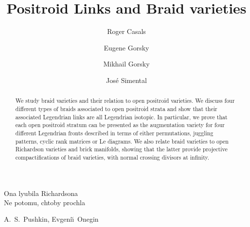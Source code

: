 \documentclass[10pt]{amsart}
\title{Positroid Links and Braid varieties}
\author[R. Casals]{Roger Casals}
\author[E. Gorsky]{Eugene Gorsky}
\author[M. Gorsky]{Mikhail Gorsky}
\author[J. Simental]{Jos\'e Simental}
\theoremstyle{plain}
\theoremstyle{definition}
\theoremstyle{remark}
\numberwithin{equation}{section}
\def\cyi{\tencyrit\cyracc}
\def\cyr{\tencyr\cyracc}
\begin{document}
\begin{abstract}
We study braid varieties and their relation to open positroid varieties. We discuss four different types of braids associated to open positroid strata and show that their associated Legendrian links are all Legendrian isotopic. In particular, we prove that each open positroid stratum can be presented as the augmentation variety for four different Legendrian fronts described in terms of either permutations, juggling patterns, cyclic rank matrices or Le diagrams. We also relate braid varieties to open Richardson varieties and brick manifolds, showing that the latter provide projective compactifications of braid varieties, with normal crossing divisors at infinity.
\end{abstract}

\maketitle
\vspace{-0.7cm}


\epigraph{
\cyi Ona lyubila Richardsona\\ Ne potomu, chtoby prochla
}{\cyr A.~S.~Pushkin, \cyi Evgeni\u\i \, Onegin\footnotemark}


\setcounter{tocdepth}{1}
\tableofcontents
\end{document}
